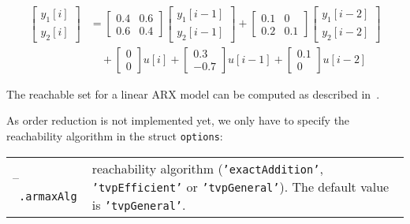 \begin{center}
\begin{minipage}[t]{0.58\textwidth}
	\vspace{10pt}
	\begin{align*}
	\begin{bmatrix} y_1[i] \\ y_2[i] \end{bmatrix} &=
	\begin{bmatrix} 0.4 & 0.6 \\ 0.6 & 0.4 \end{bmatrix} \begin{bmatrix} y_1[i-1] \\ y_2[i-1] \end{bmatrix}
	+ \begin{bmatrix} 0.1 & 0 \\ 0.2 & 0.1 \end{bmatrix} \begin{bmatrix} y_1[i-2] \\ y_2[i-2] \end{bmatrix} \\
	&\quad + \begin{bmatrix} 0 \\ 0 \end{bmatrix} u[i]
	+ \begin{bmatrix} 0.3 \\ -0.7 \end{bmatrix} u[i-1]
	+ \begin{bmatrix} 0.1 \\ 0 \end{bmatrix} u[i-2]
\end{align*}
\end{minipage}
\begin{minipage}[t]{0.4\textwidth}
	\footnotesize
	
\end{minipage}
\end{center}




The reachable set for a linear ARX model can be computed as described in~\cite{Luetzow2023a}.

As order reduction is not implemented yet, we only have to specify the reachability algorithm in the struct \texttt{options}:

\begin{center}
	\renewcommand{\arraystretch}{1.3}
	\begin{tabular}[t]{l p{11cm}}
		--~\texttt{.armaxAlg} & reachability algorithm (\texttt{'exactAddition'}\cite[Prop. 3]{Luetzow2023a}, \texttt{'tvpEfficient'}\cite[Thm. 3]{Luetzow2023a} or \texttt{'tvpGeneral'}\cite[Thm. 2]{Luetzow2023a}). The default value is \texttt{'tvpGeneral'}.
	\end{tabular}
\end{center}




